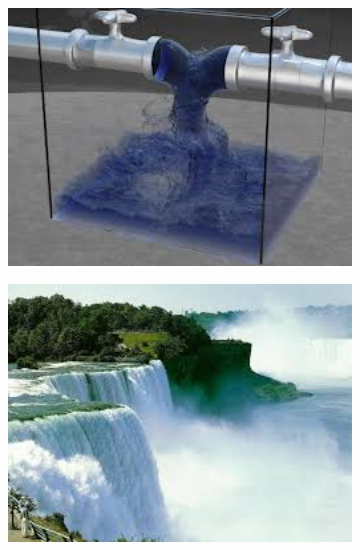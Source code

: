 \documentclass{beamer}
\begin{document}
\begin{frame}
\begin{figure}
 			\begin{subfigure}[c]{0.3\textwidth}
 		 	      \includegraphics[width=1\textwidth]{pic/images2.jpg}
 		 	\end{subfigure}
 		 	 \begin{subfigure}[c]{0.3\textwidth}
 		 	      \includegraphics[width=1\textwidth]{pic/images3.jpg}
 		 	\end{subfigure}   
 		\end{figure}
\end{frame}	
\end{document}
